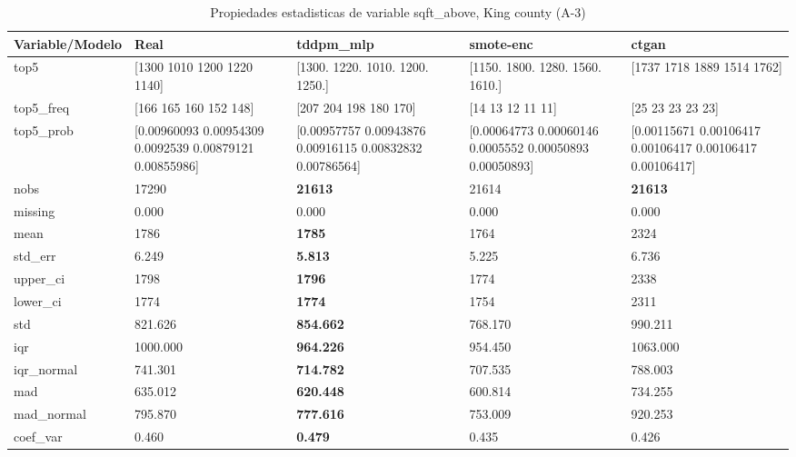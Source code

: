 \begin{table}[H]
\centering
\fontsize{8}{14}\selectfont
\caption{Propiedades  estadisticas de variable sqft\_above, King county (A-3)}
\label{table-stats-king county-a-3-sqft_above}
\begin{tabular}{|l|m{10em}|m{10em}|m{10em}|m{10em}|}
\hline
 \rowcolor[gray]{0.8}
Variable/Modelo & Real & tddpm\_mlp & smote-enc & ctgan \\
\hline top5 & [1300 1010 1200 1220 1140] & [1300. 1220. 1010. 1200. 1250.] & [1150. 1800. 1280. 1560. 1610.] & [1737 1718 1889 1514 1762] \\
\hline top5\_freq & [166 165 160 152 148] & [207 204 198 180 170] & [14 13 12 11 11] & [25 23 23 23 23] \\
\hline top5\_prob & [0.00960093 0.00954309 0.0092539  0.00879121 0.00855986] & [0.00957757 0.00943876 0.00916115 0.00832832 0.00786564] & [0.00064773 0.00060146 0.0005552  0.00050893 0.00050893] & [0.00115671 0.00106417 0.00106417 0.00106417 0.00106417] \\
\hline nobs & 17290 & \bfseries 21613 & \cellcolor[rgb]{0.9, 0.54, 0.52} 21614 & \bfseries 21613 \\
\hline missing & 0.000 & 0.000 & 0.000 & 0.000 \\
\hline mean & 1786 & \bfseries 1785 & 1764 & \cellcolor[rgb]{0.9, 0.54, 0.52} 2324 \\
\hline std\_err & 6.249 & \bfseries 5.813 & \cellcolor[rgb]{0.9, 0.54, 0.52} 5.225 & 6.736 \\
\hline upper\_ci & 1798 & \bfseries 1796 & 1774 & \cellcolor[rgb]{0.9, 0.54, 0.52} 2338 \\
\hline lower\_ci & 1774 & \bfseries 1774 & 1754 & \cellcolor[rgb]{0.9, 0.54, 0.52} 2311 \\
\hline std & 821.626 & \bfseries 854.662 & 768.170 & \cellcolor[rgb]{0.9, 0.54, 0.52} 990.211 \\
\hline iqr & 1000.000 & \bfseries 964.226 & 954.450 & \cellcolor[rgb]{0.9, 0.54, 0.52} 1063.000 \\
\hline iqr\_normal & 741.301 & \bfseries 714.782 & 707.535 & \cellcolor[rgb]{0.9, 0.54, 0.52} 788.003 \\
\hline mad & 635.012 & \bfseries 620.448 & 600.814 & \cellcolor[rgb]{0.9, 0.54, 0.52} 734.255 \\
\hline mad\_normal & 795.870 & \bfseries 777.616 & 753.009 & \cellcolor[rgb]{0.9, 0.54, 0.52} 920.253 \\
\hline coef\_var & 0.460 & \bfseries 0.479 & 0.435 & \cellcolor[rgb]{0.9, 0.54, 0.52} 0.426 \\

\end{tabular}
\end{table}
